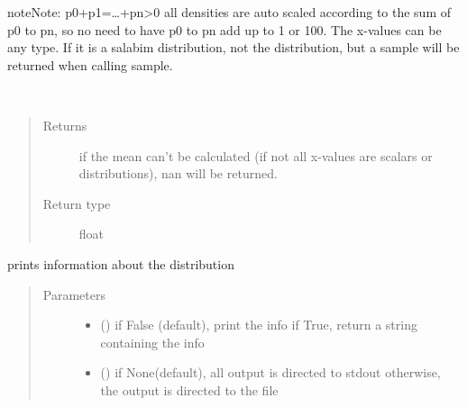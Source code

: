 \documentclass[letterpaper,10pt,english]{sphinxmanual}
\begin{document}
\begin{fulllineitems}
\begin{quote}
\begin{description}
\begin{itemize}
\end{itemize}

\end{description}\end{quote}

\begin{sphinxadmonition}{note}{Note:}
p0+p1=…+pn\textgreater{}0 
all densities are auto scaled according to the sum of p0 to pn,
so no need to have p0 to pn add up to 1 or 100. 
The x-values can be any type. 
If it is a salabim distribution, not the distribution,
but a sample will be returned when calling sample.
\end{sphinxadmonition}

\begin{fulllineitems}
\label{\detokenize{Reference:salabim.Pdf.mean}}~\begin{quote}\begin{description}
\item[{Returns}] \leavevmode
{} \textendash{} if the mean can’t be calculated (if not all x-values are scalars or distributions),
nan will be returned.

\item[{Return type}] \leavevmode
float

\end{description}\end{quote}

\end{fulllineitems}


\begin{fulllineitems}
\label{\detokenize{Reference:salabim.Pdf.print_info}}
prints information about the distribution
\begin{quote}\begin{description}
\item[{Parameters}] \leavevmode\begin{itemize}
\item {} 
 () \textendash{} if False (default), print the info
if True, return a string containing the info

\item {} 
 () \textendash{} if None(default), all output is directed to stdout 
otherwise, the output is directed to the file


\end{itemize}
\end{description}
\end{quote}
\end{fulllineitems}
\end{fulllineitems}
\end{document}
